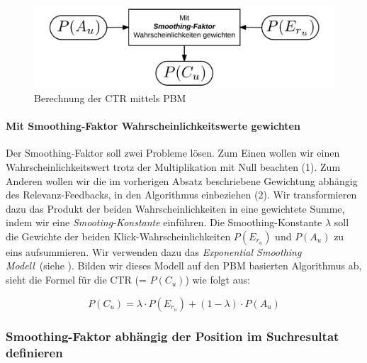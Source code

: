 \begin{figure}[H]
\centering
\vspace{-1em}
\caption[Berechnung der CTR mittels PBM]{Berechnung der CTR mittels PBM}
\label{fig:BerechnungCTRmittelsPBM}
\includegraphics[width=.5\linewidth]{gfx/BerechnungCTRmittelsPBM}
\vspace{-2.5em}
\end{figure}

\paragraph{Mit Smoothing-Faktor Wahrscheinlichkeitswerte gewichten}
Der Smoothing-Faktor soll zwei Probleme lösen. Zum Einen wollen wir einen Wahrscheinlichkeitswert trotz der Multiplikation mit Null beachten (1). Zum Anderen wollen wir die im vorherigen Absatz beschriebene Gewichtung abhängig des Relevanz-Feedbacks, in den Algorithmus einbeziehen (2). Wir transformieren dazu das Produkt der beiden Wahrscheinlichkeiten in eine gewichtete Summe, indem wir eine \textit{Smooting-Konstante} einführen. Die Smoothing-Konstante $\lambda$ soll die Gewichte der beiden Klick-Wahrscheinlichkeiten $P(E_{r_{u}})$ und $P(A_{u})$ zu eins aufsummieren. Wir verwenden dazu das \textit{Exponential Smoothing Modell}~(siehe \cite{ExpSmoothing}). Bilden wir dieses Modell auf den PBM basierten Algorithmus ab, sieht die Formel für die CTR (= $P(C_{u})$) wie folgt aus:
  
\vspace{-1.5em}
\begin{equation}
	P(C_{u}) = \lambda\cdot P(E_{r_{u}}) + (1 - \lambda)\cdot P(A_{u})
\end{equation}
\vspace{-1.5em}

\subsubsection{Smoothing-Faktor abhängig der Position im Suchresultat definieren}
\label{sec:Reranking:Methodik:Result-RerankingPBM:VerhaeltnisKlick-Wahrscheinlichkeiten}

